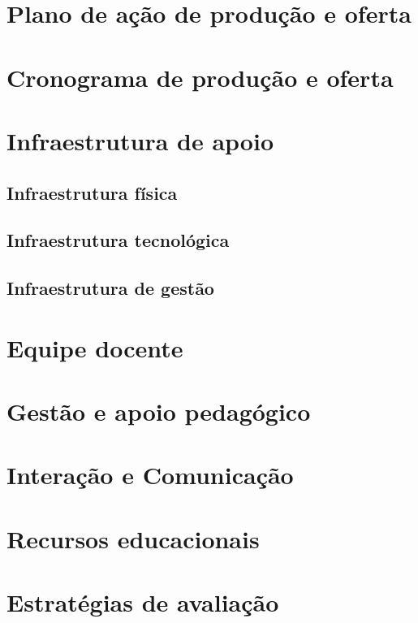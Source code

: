 \section{Plano de ação de produção e oferta}

\section{Cronograma de produção e oferta}

\section{Infraestrutura de apoio}

\subsection{Infraestrutura física}
\subsection{Infraestrutura tecnológica}
\subsection{Infraestrutura de gestão}

\section{Equipe docente}

\section{Gestão e apoio pedagógico}

\section{Interação e Comunicação}

\section{Recursos educacionais}

\section{Estratégias de avaliação}
